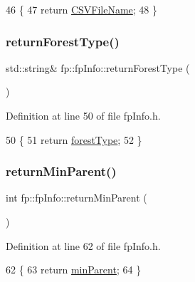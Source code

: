 \begin{DoxyCode}
46                                                  \{
47                 \textcolor{keywordflow}{return} \hyperlink{classfp_1_1fpInfo_aac01e5ddb27bc333e172a0422066af1c}{CSVFileName};
48             \}
\end{DoxyCode}
\mbox{\label{classfp_1_1fpInfo_a97280e7e3cadc5e653d8ef256eb2c82d}} 
\subsubsection{\texorpdfstring{return\+Forest\+Type()}{returnForestType()}}
{\footnotesize\ttfamily std\+::string\& fp\+::fp\+Info\+::return\+Forest\+Type (\begin{DoxyParamCaption}{ }\end{DoxyParamCaption})\hspace{0.3cm}{\ttfamily [inline]}}



Definition at line 50 of file fp\+Info.\+h.


\begin{DoxyCode}
50                                                 \{
51                 \textcolor{keywordflow}{return} \hyperlink{classfp_1_1fpInfo_a3001fbf80d86022e53578d6adf133b90}{forestType};
52             \}
\end{DoxyCode}
\mbox{\label{classfp_1_1fpInfo_ad1af845e85cb6e807694c5106baca230}} 
\subsubsection{\texorpdfstring{return\+Min\+Parent()}{returnMinParent()}}
{\footnotesize\ttfamily int fp\+::fp\+Info\+::return\+Min\+Parent (\begin{DoxyParamCaption}{ }\end{DoxyParamCaption})\hspace{0.3cm}{\ttfamily [inline]}}



Definition at line 62 of file fp\+Info.\+h.


\begin{DoxyCode}
62                                         \{
63                 \textcolor{keywordflow}{return} \hyperlink{classfp_1_1fpInfo_a128fab7ba6da0fc76da00b48bb1bd7d5}{minParent};
64             \}
\end{DoxyCode}
\mbox{\label{classfp_1_1fpInfo_a058477c4f05818c220efa469b7b630bb}} 

